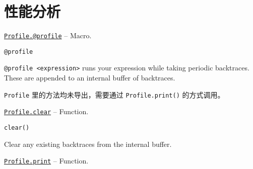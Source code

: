 \hypertarget{13446659783021526147}{}


\chapter{性能分析}


\hypertarget{9691715859147716436}{} 
\hyperlink{9691715859147716436}{\texttt{Profile.@profile}}  -- {Macro.}

\begin{adjustwidth}{2em}{0pt}


\begin{verbatim}
@profile
\end{verbatim}

\texttt{@profile <expression>} runs your expression while taking periodic backtraces. These are appended to an internal buffer of backtraces.



\end{adjustwidth}

\texttt{Profile} 里的方法均未导出，需要通过 \texttt{Profile.print()} 的方式调用。


\hypertarget{15414823368700214048}{} 
\hyperlink{15414823368700214048}{\texttt{Profile.clear}}  -- {Function.}

\begin{adjustwidth}{2em}{0pt}


\begin{verbatim}
clear()
\end{verbatim}

Clear any existing backtraces from the internal buffer.



\end{adjustwidth}
\hypertarget{2955792207246042270}{} 
\hyperlink{2955792207246042270}{\texttt{Profile.print}}  -- {Function.}

